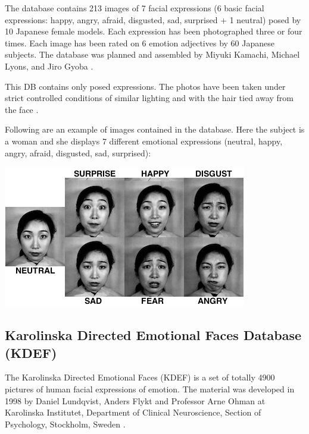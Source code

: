 \vspace{\baselineskip}
\noindent The database contains 213 images of 7 facial expressions (6 basic facial expressions: happy, angry, afraid, disgusted, sad, surprised + 1 neutral) posed by 10 Japanese female models. Each expression has been photographed three or four times. Each image has been rated on 6 emotion adjectives by 60 Japanese subjects. The database was planned and assembled by Miyuki Kamachi, Michael Lyons, and Jiro Gyoba \cite{JAFFE}.
\newline

\noindent This DB contains only posed expressions. The photos have been taken under strict controlled conditions of similar lighting and with the hair tied away from the face \cite{BET12}. 
\newline

\noindent Following are an example of images contained in the database. Here the subject is a woman and she displays 7 different emotional expressions (neutral, happy, angry, afraid, disgusted, sad, surprised): 
\newline

\vspace{\baselineskip}
\begin{center}
\noindent \includegraphics[scale=0.8]{figures/jaffe_7facialexpressions} 
\newline
\end{center} 

\subsection{Karolinska Directed Emotional Faces Database (KDEF)}

\vspace{\baselineskip}
\noindent The Karolinska Directed Emotional Faces (KDEF) is a set of totally 4900 pictures of human facial expressions of emotion. The material was developed in 1998 by Daniel Lundqvist, Anders Flykt and Professor Arne Ohman at Karolinska Institutet, Department of Clinical Neuroscience, Section of Psychology, Stockholm, Sweden \cite{KDEF}.
\newline

